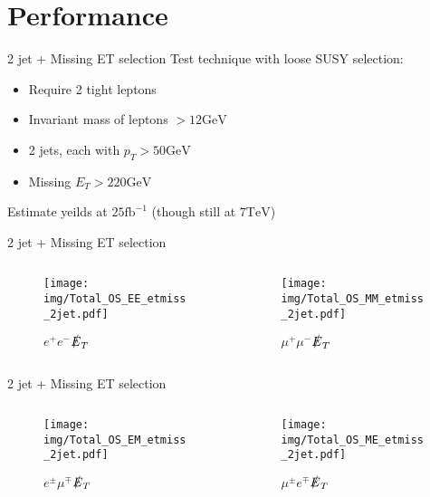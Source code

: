 \documentclass{beamer}
\begin{document}
\section{Performance}

\begin{frame}{2 jet + Missing ET selection}
Test technique with loose SUSY selection:
\begin{itemize}
\item Require 2 tight leptons
\item Invariant mass of leptons $> 12\text{GeV}$
\item 2 jets, each with $p_T > 50\text{GeV}$
\item Missing $E_T > 220\text{GeV}$
\end{itemize}
Estimate yeilds at $25\text{fb}^{-1}$ (though still at $7 \text{TeV}$)
\end{frame}

\begin{frame}{2 jet + Missing ET selection}
  \begin{columns}
    \begin{column}{0.45\textwidth}\begin{figure}
      \caption{$e^{+}e^{-}$$\slashed{E}_{T}$}
      \texttt{[image: img/Total\_OS\_EE\_etmiss\_2jet.pdf]}
    \end{figure}\end{column}
    \begin{column}{0.45\textwidth}\begin{figure}
      \caption{$\mu^{+}\mu^{-}$$\slashed{E}_{T}$}
      \texttt{[image: img/Total\_OS\_MM\_etmiss\_2jet.pdf]}
    \end{figure}\end{column}
  \end{columns}
\end{frame}

\begin{frame}{2 jet + Missing ET selection}
  \begin{columns}
    \begin{column}{0.45\textwidth}\begin{figure}
      \caption{$e^{\pm}\mu^{\mp}$$\slashed{E}_{T}$}
      \texttt{[image: img/Total\_OS\_EM\_etmiss\_2jet.pdf]}
    \end{figure}\end{column}
    \begin{column}{0.45\textwidth}\begin{figure}
      \caption{$\mu^{\pm}e^{\mp}$$\slashed{E}_{T}$}
      \texttt{[image: img/Total\_OS\_ME\_etmiss\_2jet.pdf]}
    \end{figure}\end{column}
  \end{columns}
\end{frame}
\end{document}
